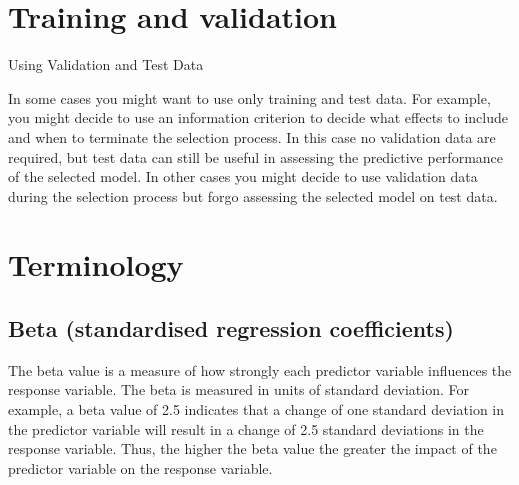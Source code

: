 
\section{Training and validation}
Using Validation and Test Data


In some cases you might want to use only training and test data. For example, you might decide to use an information criterion to decide what effects to include and when to terminate the selection process. In this case no validation data are required, but test data can still be useful in assessing the predictive performance of the selected model. In other cases you might decide to use validation data during the selection process but forgo assessing the selected model on test data. 




\section{Terminology}
\subsection{Beta (standardised regression coefficients)}
The beta value is a measure of how strongly each predictor variable influences the
response variable. The beta is measured in units of standard deviation. For example,
a beta value of 2.5 indicates that a change of one standard deviation in the predictor
variable will result in a change of 2.5 standard deviations in the response variable.
Thus, the higher the beta value the greater the impact of the predictor variable on
the response variable.


